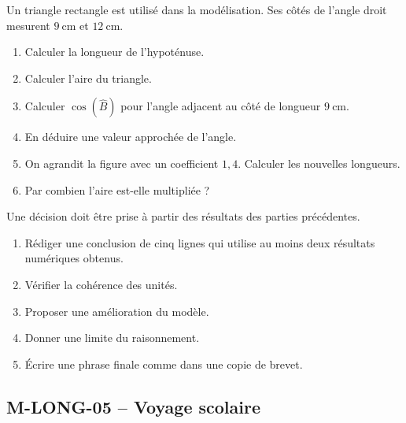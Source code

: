 \documentclass[11pt,a4paper]{article}
\newcounter{exercice}
\begin{document}
\begin{exercice}
Un triangle rectangle est utilisé dans la modélisation. Ses côtés de l'angle droit mesurent $9\ \mathrm{cm}$ et $12\ \mathrm{cm}$.
\begin{enumerate}
  \item Calculer la longueur de l'hypoténuse.
  \item Calculer l'aire du triangle.
  \item Calculer $\cos(\widehat{B})$ pour l'angle adjacent au côté de longueur $9\ \mathrm{cm}$.
  \item En déduire une valeur approchée de l'angle.
  \item On agrandit la figure avec un coefficient $1{,}4$. Calculer les nouvelles longueurs.
  \item Par combien l'aire est-elle multipliée ?
\end{enumerate}
\end{exercice}

\begin{exercice}
Une décision doit être prise à partir des résultats des parties précédentes.
\begin{enumerate}
  \item Rédiger une conclusion de cinq lignes qui utilise au moins deux résultats numériques obtenus.
  \item Vérifier la cohérence des unités.
  \item Proposer une amélioration du modèle.
  \item Donner une limite du raisonnement.
  \item Écrire une phrase finale comme dans une copie de brevet.
\end{enumerate}
\end{exercice}
\newpage
\subsection{M-LONG-05 -- Voyage scolaire}
\end{document}
